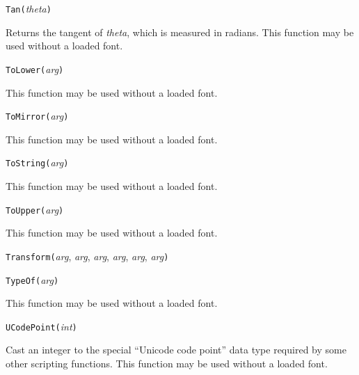 \texttt{Tan(}\textit{theta}\texttt{)}

Returns the tangent of \textit{theta}, which is measured in radians.
This function may be used without a loaded font.



\texttt{ToLower(}\textit{arg}\texttt{)}

This function may be used without a loaded font.



\texttt{ToMirror(}\textit{arg}\texttt{)}

This function may be used without a loaded font.



\texttt{ToString(}\textit{arg}\texttt{)}

This function may be used without a loaded font.



\texttt{ToUpper(}\textit{arg}\texttt{)}

This function may be used without a loaded font.



\texttt{Transform(}\textit{arg}, \textit{arg}, \textit{arg}, \textit{arg}, \textit{arg}, \textit{arg}\texttt{)}



\texttt{TypeOf(}\textit{arg}\texttt{)}

This function may be used without a loaded font.



\texttt{UCodePoint(}\textit{int}\texttt{)}

Cast an integer to the special ``Unicode code point'' data type required by
some other scripting functions.  This function may be used without a loaded
font.



